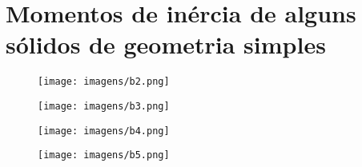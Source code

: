 \documentclass[a4paper, 12pt]{article}
\begin{document}
\section{Momentos de inércia de alguns sólidos de geometria simples}
	\begin{figure}[h]
		\center
		\texttt{[image: imagens/b2.png]} 
	\end{figure}
	\begin{figure}[h]
		\center
		\texttt{[image: imagens/b3.png]} 
	\end{figure}
	\begin{figure}[h]
		\center
		\texttt{[image: imagens/b4.png]} 
	\end{figure}
	\begin{figure}[h]
		\center
		\texttt{[image: imagens/b5.png]} 
	\end{figure}
\end{document}
